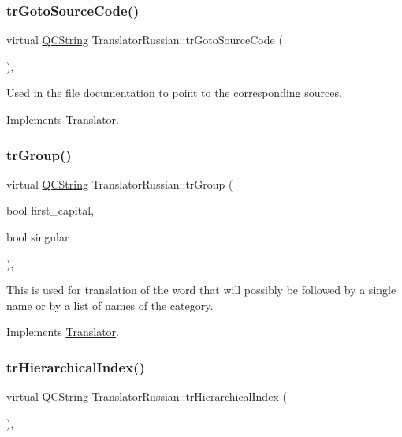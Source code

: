 \subsubsection{\texorpdfstring{trGotoSourceCode()}{trGotoSourceCode()}}
{\footnotesize\ttfamily virtual \mbox{\hyperlink{class_q_c_string}{Q\+C\+String}} Translator\+Russian\+::tr\+Goto\+Source\+Code (\begin{DoxyParamCaption}{ }\end{DoxyParamCaption})\hspace{0.3cm}{\ttfamily [inline]}, {\ttfamily [virtual]}}

Used in the file documentation to point to the corresponding sources. 

Implements \mbox{\hyperlink{class_translator}{Translator}}.

\mbox{\label{class_translator_russian_af5ab1bb589fabb5de4104a3628190190}} 
\subsubsection{\texorpdfstring{trGroup()}{trGroup()}}
{\footnotesize\ttfamily virtual \mbox{\hyperlink{class_q_c_string}{Q\+C\+String}} Translator\+Russian\+::tr\+Group (\begin{DoxyParamCaption}\item[{bool}]{first\+\_\+capital,  }\item[{bool}]{singular }\end{DoxyParamCaption})\hspace{0.3cm}{\ttfamily [inline]}, {\ttfamily [virtual]}}

This is used for translation of the word that will possibly be followed by a single name or by a list of names of the category. 

Implements \mbox{\hyperlink{class_translator}{Translator}}.

\mbox{\label{class_translator_russian_a79d936076eca8ec5691bf0045d485dff}} 
\subsubsection{\texorpdfstring{trHierarchicalIndex()}{trHierarchicalIndex()}}
{\footnotesize\ttfamily virtual \mbox{\hyperlink{class_q_c_string}{Q\+C\+String}} Translator\+Russian\+::tr\+Hierarchical\+Index (\begin{DoxyParamCaption}{ }\end{DoxyParamCaption})\hspace{0.3cm}{\ttfamily [inline]}, {\ttfamily [virtual]}}

